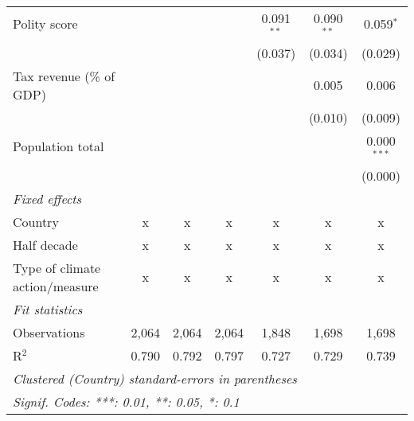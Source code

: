 \begin{tabular}{lcccccc}
   Polity score                                                   &         &              &                & 0.091$^{**}$   & 0.090$^{**}$  & 0.059$^{*}$\\   
                                                                  &         &              &                & (0.037)        & (0.034)       & (0.029)\\   
   Tax revenue (\% of GDP)                                        &         &              &                &                & 0.005         & 0.006\\   
                                                                  &         &              &                &                & (0.010)       & (0.009)\\   
   Population total                                               &         &              &                &                &               & 0.000$^{***}$\\   
                                                                  &         &              &                &                &               & (0.000)\\   
   \emph{Fixed effects}\\
   Country                                                        & x       & x            & x              & x              & x             & x\\  
   Half decade                                                    & x       & x            & x              & x              & x             & x\\  
   Type of climate action/measure                                 & x       & x            & x              & x              & x             & x\\  
   \midrule \emph{Fit statistics}\\
   Observations                                                   & 2,064   & 2,064        & 2,064          & 1,848          & 1,698         & 1,698\\  
   R$^2$                                                          & 0.790   & 0.792        & 0.797          & 0.727          & 0.729         & 0.739\\  
   \midrule
   \multicolumn{7}{l}{\emph{Clustered (Country) standard-errors in parentheses}}\\
   \multicolumn{7}{l}{\emph{Signif. Codes: ***: 0.01, **: 0.05, *: 0.1}}\\
\end{tabular}
\par\endgroup


